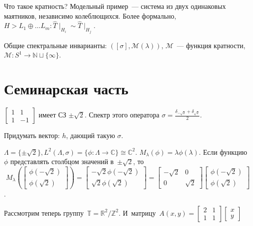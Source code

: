 \documentclass{article}
\begin{document}
Что такое кратность? Модельный пример~--- система из двух одинаковых маятников,
независимо колеблющихся. Более формально,
$H > L_1 \oplus \ldots L_m: \hat T\mid_{H_i} \sim \hat T\mid_{H_j}$.

Общие спектральные инварианты: $([\sigma], \mathcal{M}(\lambda))$,
$\mathcal{M}$~--- функция кратности, $\mathcal{M}: S^1 \rightarrow \mathbb{N}
\sqcup \{\infty\}$.

\section{Семинарская часть}

$\begin{bmatrix}1 & 1\\ 1 & -1\end{bmatrix}$ имеет СЗ $\pm\sqrt{2}$. Спектр
	этого оператора $\sigma = \frac{\delta_{-\sqrt{2}} + \delta_{\sqrt{2}}}{2}$.

\begin{exercise}[$\ast$]
	Придумать вектор: $h$, дающий такую $\sigma$.
\end{exercise}

$\Lambda = \{\pm \sqrt{2}\}, L^2(\Lambda, \sigma) = \{\phi: \Lambda \rightarrow
\mathbb{C} \} \cong \mathbb{C}^2$. $M_\lambda(\phi) = \lambda \phi(\lambda)$.
Если функцию $\phi$ представлять столбцом значений в~$\pm\sqrt{2}$, то
$$M_\lambda(\begin{bmatrix}\phi(-\sqrt{2})\\ \phi(\sqrt{2})\end{bmatrix}) =
\begin{bmatrix} -\sqrt{2}\phi(-\sqrt{2})\\ \sqrt{2}\phi(\sqrt{2}) \end{bmatrix}
= \begin{bmatrix} -\sqrt{2} & 0\\ 0 & \sqrt{2}\end{bmatrix}
	\begin{bmatrix}\phi(-\sqrt{2})\\ \phi(\sqrt{2})\end{bmatrix}$$.

Рассмотрим теперь группу~$\mathbb{T} = \mathbb{R}^2 / \mathbb{Z}^2$.
И~матрицу~$A(x, y) = \begin{bmatrix}2&1\\1&1\end{bmatrix}
	\begin{bmatrix}x\\y\end{bmatrix}$
\end{document}
